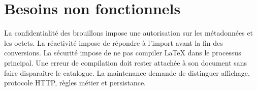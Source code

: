 \section{Besoins non fonctionnels}
La confidentialité des brouillons impose une autorisation sur les métadonnées et les octets. La réactivité impose de répondre à l’import avant la fin des conversions. La sécurité impose de ne pas compiler LaTeX dans le processus principal. Une erreur de compilation doit rester attachée à son document sans faire disparaître le catalogue. La maintenance demande de distinguer affichage, protocole HTTP, règles métier et persistance.
